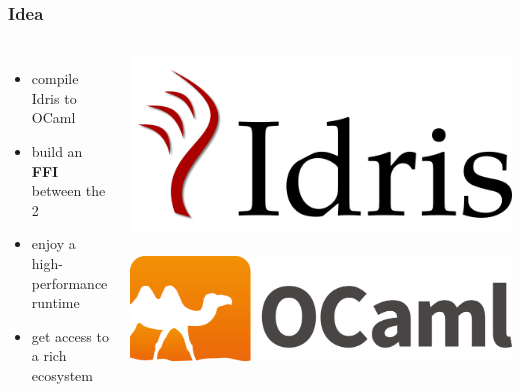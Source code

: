 \documentclass[aspectratio=169]{beamer}
\begin{document}
\begin{frame}[t]
  \frametitle{Idea}
  \begin{columns}[c]
    \begin{itemize}
      \item compile Idris to OCaml
      \item build an \textbf{FFI} between the 2
      \item enjoy a high-performance runtime
      \item get access to a rich ecosystem
    \end{itemize}
    \includegraphics[width=.5\textwidth]{logo.png}\\~\\
    \includegraphics[width=.5\textwidth]{ocamllogo.png}
  \end{columns}
\end{frame}


\end{document}

